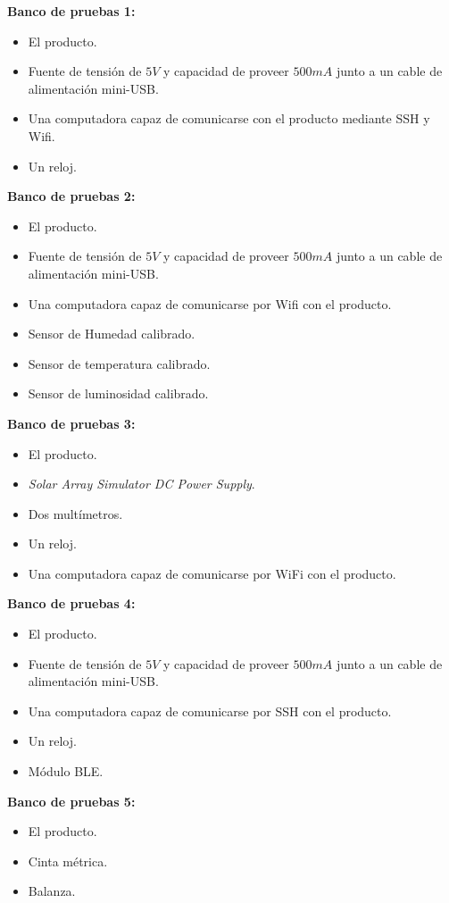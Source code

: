 \textbf{Banco de pruebas 1:}
\begin{itemize}
	\item El producto.	
	\item Fuente de tensión de $5V$ y capacidad de proveer $500mA$ junto a un cable de alimentación mini-USB.
	\item Una computadora capaz de comunicarse con el producto mediante SSH y Wifi.
	\item Un reloj.
\end{itemize}

\textbf{Banco de pruebas 2:}
\begin{itemize}
	\item El producto.	
	\item Fuente de tensión de $5V$ y capacidad de proveer $500mA$ junto a un cable de alimentación mini-USB.
	\item Una computadora capaz de comunicarse por Wifi con el producto.
	\item Sensor de Humedad calibrado.
	\item Sensor de temperatura calibrado.
	\item Sensor de luminosidad calibrado.
\end{itemize}

\textbf{Banco de pruebas 3:}
\begin{itemize}
	\item El producto.
	\item \textit{Solar Array Simulator DC Power Supply}.
	\item Dos multímetros.
	\item Un reloj.
	\item Una computadora capaz de comunicarse por WiFi con el producto.
\end{itemize}

\textbf{Banco de pruebas 4:}
\begin{itemize}
	\item El producto.	
	\item Fuente de tensión de $5V$ y capacidad de proveer $500mA$ junto a un cable de alimentación mini-USB.
	\item Una computadora capaz de comunicarse por SSH con el producto.
	\item Un reloj.
	\item Módulo BLE.
\end{itemize}


\textbf{Banco de pruebas 5:}
\begin{itemize}
	\item El producto.
	\item Cinta métrica.
	\item Balanza.
\end{itemize}

